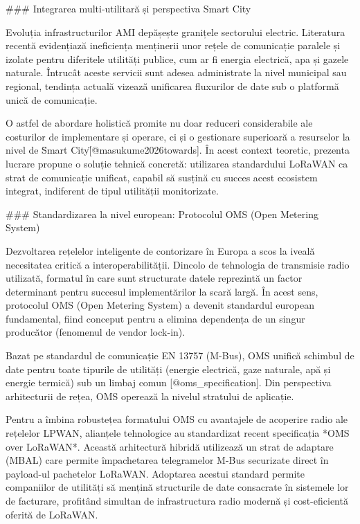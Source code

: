 ### Integrarea multi-utilitară și perspectiva Smart City

Evoluția infrastructurilor AMI depășește granițele sectorului electric.
Literatura recentă evidențiază ineficiența menținerii unor rețele de
comunicație paralele și izolate pentru diferitele utilități publice, cum
ar fi energia electrică, apa și gazele naturale. Întrucât aceste
servicii sunt adesea administrate la nivel municipal sau regional,
tendința actuală vizează unificarea fluxurilor de date sub o platformă
unică de comunicație.

O astfel de abordare holistică promite nu doar reduceri considerabile
ale costurilor de implementare și operare, ci și o gestionare superioară
a resurselor la nivel de \"Smart City\" [@masukume2026towards]. În acest
context teoretic, prezenta lucrare propune o soluție tehnică concretă:
utilizarea standardului LoRaWAN ca strat de comunicație unificat,
capabil să susțină cu succes acest ecosistem integrat, indiferent de
tipul utilității monitorizate.

### Standardizarea la nivel european: Protocolul OMS (Open Metering System)

Dezvoltarea rețelelor inteligente de contorizare în Europa a scos la
iveală necesitatea critică a interoperabilității. Dincolo de tehnologia
de transmisie radio utilizată, formatul în care sunt structurate datele
reprezintă un factor determinant pentru succesul implementărilor la
scară largă. În acest sens, protocolul OMS (Open Metering System) a
devenit standardul european fundamental, fiind conceput pentru a elimina
dependența de un singur producător (fenomenul de vendor lock-in).

Bazat pe standardul de comunicație EN 13757 (M-Bus), OMS unifică
schimbul de date pentru toate tipurile de utilități (energie electrică,
gaze naturale, apă și energie termică) sub un limbaj comun
[@oms_specification]. Din perspectiva arhitecturii de rețea, OMS
operează la nivelul stratului de aplicație.

Pentru a îmbina robustețea formatului OMS cu avantajele de acoperire
radio ale rețelelor LPWAN, alianțele tehnologice au standardizat recent
specificația *OMS over LoRaWAN*. Această arhitectură hibridă utilizează
un strat de adaptare (MBAL) care permite împachetarea telegramelor M-Bus
securizate direct în payload-ul pachetelor LoRaWAN. Adoptarea acestui
standard permite companiilor de utilități să mențină structurile de date
consacrate în sistemele lor de facturare, profitând simultan de
infrastructura radio modernă și cost-eficientă oferită de LoRaWAN.

